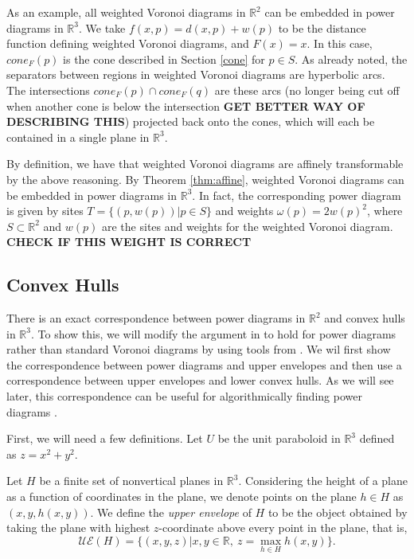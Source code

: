 \documentclass[a4paper, 11pt]{article}
\newcommand{\R}{\mathbb{R}}
\begin{document}
As an example, all weighted Voronoi diagrams in $\R^2$ can be embedded in power diagrams in $\R^3$. We take $f(x,p) = d(x,p) + w(p)$ to be the
distance function defining weighted Voronoi diagrams, and $F(x) = x$. In this case, $cone_F(p)$ is the cone described in Section \ref{cone} for $p \in
S$. As already noted, the separators between regions in weighted Voronoi diagrams are hyperbolic arcs. The intersections $cone_F(p) \cap cone_F(q)$
are these arcs (no longer being cut off when another cone is below the intersection \textbf{GET BETTER WAY OF DESCRIBING THIS}) projected back onto
the cones, which will each be contained in a single plane in $\R^3$.

By definition, we have that weighted Voronoi diagrams are affinely transformable by the above reasoning. By Theorem \ref{thm:affine}, weighted Voronoi
diagrams can be embedded in power diagrams in $\R^3$. In fact, the corresponding power diagram is given by sites $T = \{ (p, w(p)) | p \in S \}$ and
weights $\omega(p) = 2 w(p)^2$, where $S \subset \R^2$ and $w(p)$ are the sites and weights for the weighted Voronoi diagram. \textbf{CHECK IF THIS
WEIGHT IS CORRECT}

\subsection{Convex Hulls}

There is an exact correspondence between power diagrams in $\R^2$ and convex hulls in $\R^3$. To show this, we will modify the argument in
\cite{comp_geom} to hold for power diagrams rather than standard Voronoi diagrams by using tools from \cite{aurenhammer_power}. We wil first show the correspondence between power diagrams and
upper envelopes and then use a correspondence between upper envelopes and lower convex hulls. As we will see later, this correspondence can be useful
for algorithmically finding power diagrams \cite{aurenhammer_power}.

First, we will need a few definitions. Let $U$ be the unit paraboloid in $\R^3$ defined as $z = x^2 + y^2$.

Let $H$ be a finite set of nonvertical planes in $\R^3$. Considering the height of a plane as a function of coordinates in the plane, we denote points
on the plane $h \in H$ as $(x,y,h(x,y))$. We define the \textit{upper envelope} of $H$ to be the object obtained by taking the plane with highest
$z$-coordinate above every point in the plane, that is,
\[ \mathcal{UE}(H) = \{ (x,y,z) | x,y \in \R, \ z = \max_{h \in H} h(x,y) \} .\]
\end{document}
